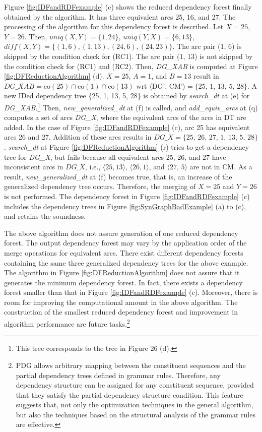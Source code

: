 \documentclass[english]{jnlp_1.4_rep}
\theoremstyle{break}
\theoremstyle{plain}
\theoremstyle{plain}
\begin{document}
Figure \ref{fig:IDFandRDFexample} (c) shows the reduced dependency forest
finally obtained by the algorithm. It has three equivalent arcs 25, 16,
and 27. The processing of the algorithm for this dependency forest is
described. Let $X=25$, $Y=26$. Then,
$\textit{uniq}(X, Y)=\{1, 24\}$, $\textit{uniq}(Y, X)=\{6, 13\}$, $\mathit{diff}(X, Y)=\{(1, 6), (1, 13), (24, 6), (24, 23)\}$. The
arc pair (1, 6) is skipped by the condition check for (RC1). The arc
pair (1, 13) is not skipped by the condition check for (RC1) and
(RC2). Then, \textit{DG\_XAB} is computed at
Figure \ref{fig:DFReductionAlgorithm} (d). $X=25$, $A=1$, and $B=13$ result
in $\mathit{DG\_XAB}=\mathrm{co}(25) \cap \mathrm{co}(1) \cap \mathrm{co}(13)$ wrt $\langle\text{DG', CM'}\rangle
=\{\text{25, 1, 13, 5, 28}\}$. A new IDed dependency tree \{25, 1, 13, 5, 28\} is
obtained by \textit{search\_dt} at (e) for \textit{DG\_XAB}.\footnote{This tree
corresponds to the tree in Figure 26 (d).} Then, \textit{new\_generalized\_dt} at
(f) is called, and \textit{add\_equiv\_arcs} at (q) computes a set of arcs
\textit{DG\_X}, where the equivalent arcs of the arcs in DT are added. In the
case of Figure \ref{fig:IDFandRDFexample} (c), arc 25 has equivalent arcs
26 and 27. Addition of these arcs results in
$\mathit{DG\_X}=\{\text{25, 26, 27, 1, 13, 5, 28}\}$. \textit{search\_dt} at
Figure \ref{fig:DFReductionAlgorithm} (r) tries to get a dependency tree
for \textit{DG\_X}, but fails because all equivalent arcs 25, 26, and 27 have
inconsistent arcs in $DG\_X$, i.e., $\langle 25, 13\rangle$, $\langle 26, 1\rangle$, and
$\langle\text{27, 5}\rangle$ are not in CM. As a result, \textit{new\_generalized\_dt} at (f)
becomes true, that is, an increase of the generalized dependency tree
occurs. Therefore, the merging of $X=25$ and $Y=26$ is not
performed. The dependency forest in Figure \ref{fig:IDFandRDFexample} (c)
includes the dependency trees in Figure \ref{fig:SynGraphBadExample} (a)
to (c), and retains the soundness.

The above algorithm does not assure generation of one reduced
dependency forest. The output dependency forest may vary by the
application order of the merge operations for equivalent arcs. There
exist different dependency forests containing the same three
generalized dependency trees for the above example. The algorithm in
Figure \ref{fig:DFReductionAlgorithm} does not assure that it generates
the minimum dependency forest. In fact, there exists a dependency
forest smaller than that in Figure \ref{fig:IDFandRDFexample}
(c). Moreover, there is room for improving the computational amount in
the above algorithm. The construction of the smallest reduced
dependency forest and improvement in algorithm performance are future
tasks.\footnote{PDG allows arbitrary mapping between the constituent
sequences and the partial dependency trees defined in grammar
rules. Therefore, any dependency structure can be assigned for any
constituent sequence, provided that they satisfy the partial
dependency structure condition. This feature suggests that, not only
the optimization techniques in the general algorithm, but also the
techniques based on the structural analysis of the grammar rules are
effective.}
\end{document}
